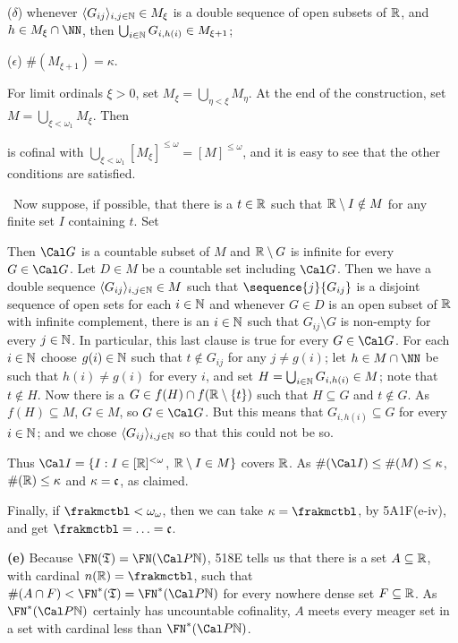 {{($\delta$) whenever $\langle G_{ij}\rangle_{i,j\in\Bbb N}\in M_{\xi}$ is
a double sequence of open subsets of $\Bbb R$, and
$h\in M_{\xi}\cap\NN$, then
$\bigcup_{i\in\Bbb N}G_{i,h(i)}\in M_{\xi+1}$;

($\epsilon$) $\#(M_{\xi+1})=\kappa$.}

\noindent For limit ordinals $\xi>0$, set
$M_{\xi}=\bigcup_{\eta<\xi}M_{\eta}$.   At the end of the construction,
set $M=\bigcup_{\xi<\omega_1}M_{\xi}$.   Then


\noindent is cofinal with
$\bigcup_{\xi<\omega_1}[M_{\xi}]^{\le\omega}=[M]^{\le\omega}$, and it is
easy to see that the other conditions are satisfied.\ \Qed

\medskip

 \Quer\ Now suppose, if possible, that there is a
$t\in\Bbb R$ such that $\Bbb R\setminus I\notin M$ for any finite set
$I$ containing $t$.   Set


\noindent Then $\Cal G$ is a countable subset of
$M$ and $\Bbb R\setminus G$ is infinite for every $G\in\Cal G$.   Let
$D\in M$ be a countable set including $\Cal G$.   Then we have a double
sequence $\langle G_{ij}\rangle_{i,j\in\Bbb N}\in M$ such that
$\sequence{j}{G_{ij}}$ is a disjoint sequence of open sets for each $i\in\Bbb N$ and whenever
$G\in D$ is an open subset of $\Bbb R$ with infinite complement, there
is an $i\in\Bbb N$ such that $G_{ij}\setminus G$ is non-empty for every
$j\in\Bbb N$.   In particular, this last clause is true for every
$G\in\Cal G$.   For each $i\in\Bbb N$ choose $g(i)\in\Bbb N$ such that
$t\notin G_{ij}$ for any $j\ne g(i)$;   let $h\in M\cap\NN$ be such that
$h(i)\ne g(i)$ for every $i$, and set
$H=\bigcup_{i\in\Bbb N}G_{i,h(i)}\in M$;  note that $t\notin H$.   Now
there is a
$G\in f(H)\cap f(\Bbb R\setminus\{t\})$ such that
$H\subseteq G$ and $t\notin G$.   As $f(H)\subseteq M$,
$G\in M$, so $G\in\Cal G$.   But this means that $G_{i,h(i)}\subseteq G$ for every
$i\in\Bbb N$;  and we chose $\langle G_{ij}\rangle_{i,j\in\Bbb N}$ so
that this could not be so.\ \Bang

Thus $\Cal I=\{I:I\in[\Bbb R]^{<\omega}$, $\Bbb R\setminus I\in M\}$
covers $\Bbb R$.   As $\#(\Cal I)\le\#(M)\le\kappa$,
$\#(\Bbb R)\le\kappa$ and $\kappa=\frak c$, as claimed.

\medskip

 Finally, if $\frakmctbl<\omega_{\omega}$, then we can
take $\kappa=\frakmctbl$, by 5A1F(e-iv), and get $\frakmctbl=\ldots=\frak c$.

\medskip

{\bf (e)} Because $\FN(\frak T)=\FN(\Cal P\Bbb N)$, 518E tells us that
there is a set $A\subseteq\Bbb R$, with cardinal $n(\Bbb R)=\frakmctbl$,
such that
$\#(A\cap F)<\FN^*(\frak T)=\FN^*(\Cal P\Bbb N)$ for every nowhere dense
set $F\subseteq\Bbb R$.   As $\FN^*(\Cal P\Bbb N)$ certainly has
uncountable cofinality, $A$ meets every meager set in a set with cardinal less
than $\FN^*(\Cal P\Bbb N)$.
}%

